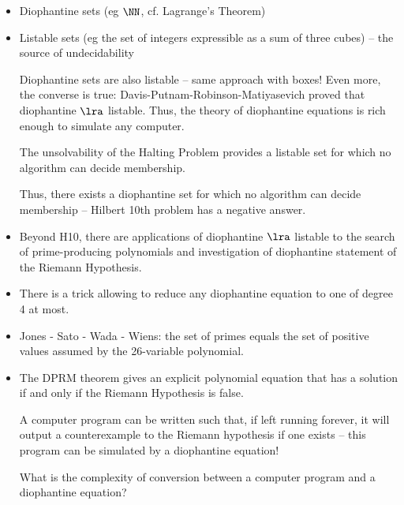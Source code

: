 \documentclass[11pt]{scrartcl}
\begin{document}

\begin{itemize}
\item Diophantine sets (eg \(\NN\), cf. Lagrange's Theorem)
\item Listable sets (eg the set of integers expressible as a sum of
  three cubes) -- the source of undecidability

  Diophantine sets are also listable -- same approach with boxes!
  Even more, the converse is true: Davis-Putnam-Robinson-Matiyasevich
  proved that diophantine \(\lra\) listable. Thus, the theory of
  diophantine equations is rich enough to simulate any computer.

  The unsolvability of the Halting Problem provides a listable set for
  which no algorithm can decide membership.

  Thus, there exists a diophantine set for which no algorithm can
  decide membership -- Hilbert 10th problem has a negative answer.

\item Beyond H10, there are applications of diophantine \(\lra\)
  listable to the search of prime-producing polynomials and
  investigation of diophantine statement of the Riemann Hypothesis.

\item There is a trick allowing to reduce any diophantine equation to
  one of degree 4 at most.

\item Jones - Sato - Wada - Wiens: the set of primes equals the set of
  positive values assumed by the 26-variable polynomial.

\item The DPRM theorem gives an explicit polynomial equation that has
  a solution if and only if the Riemann Hypothesis is false.

  A computer program can be written such that, if left running
  forever, it will output a counterexample to the Riemann hypothesis
  if one exists -- this program can be simulated by a diophantine equation!

  \begin{ques*}

    What is the complexity of conversion between a computer program
    and a diophantine equation?

  \end{ques*}


\end{itemize}
\end{document}
